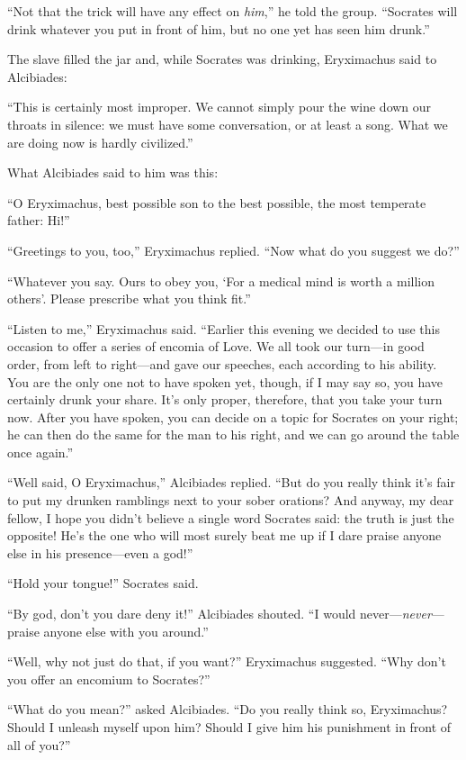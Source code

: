 “Not that the trick will have any effect on {\em him},” he told the
group. “Socrates will drink whatever you put in front of him, but no one
yet has seen him drunk.”

The slave filled the jar and, while Socrates was drinking, Eryximachus
said to Alcibiades:

 “This is certainly most improper. We cannot simply pour the wine
down our throats in silence: we must have some conversation, or at least
a song. What we are doing now is hardly civilized.”

What Alcibiades said to him was this:

“O Eryximachus, best possible son to the best possible, the most
temperate father: Hi!”

“Greetings to you, too,” Eryximachus replied. “Now what do you suggest
we do?”

“Whatever you say. Ours to obey you, ‘For a medical mind is worth a
million others’.
Please prescribe what you think fit.”

 “Listen to me,” Eryximachus said. “Earlier this evening we
decided to use this occasion to offer a series of encomia of Love. We
all took our turn---in good order, from left to right---and gave our
speeches, each according to his ability. You are the only one not to
have spoken yet, though, if I may say so, you have certainly drunk your
share. It’s only proper, therefore, that you take your turn now. After
you have spoken, you can decide on a topic for Socrates on your right;
he can then do the same for the man to his right, and we can go around
the table once again.”

“Well said, O Eryximachus,” Alcibiades replied. “But do you really think
it’s fair to put my drunken ramblings next to your sober orations? And
 anyway, my dear fellow, I hope you didn’t believe a single word
Socrates said: the truth is just the opposite! He’s the one who will
most surely beat me up if I dare praise anyone else in his
presence---even a god!”

“Hold your tongue!” Socrates said.

“By god, don’t you dare deny it!” Alcibiades shouted. “I would
never---{\em never}---praise anyone else with you around.”

 “Well, why not just do that, if you want?” Eryximachus
suggested. “Why don’t you offer an encomium to Socrates?”

“What do you mean?” asked Alcibiades. “Do you really think so,
Eryximachus? Should I unleash myself upon him? Should I give him his
punishment in front of all of you?”

